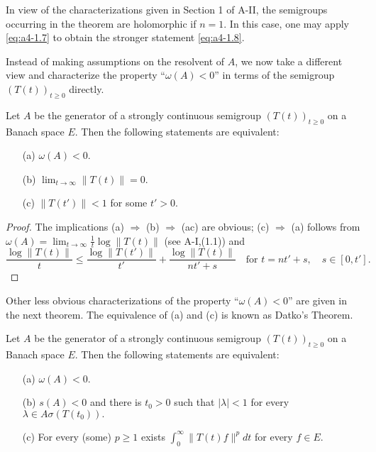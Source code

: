 \bigskip
\noindent In view of the characterizations given in Section 1 of A-II, the semigroups occurring in the theorem are holomorphic if \( n = 1 \). 
In this case, one may apply \eqref{eq:a4-1.7} to obtain the stronger statement \eqref{eq:a4-1.8}.

\bigskip\noindent Instead of making assumptions on the resolvent of \( A \), we now take a different view and characterize the property ``\( \omega(A) < 0 \)'' in terms of the semigroup \( (T(t))_{t \geq 0} \) directly.

\bigskip
\begin{proposition} \label{prop:a4-1.10} Let \( A \) be the generator of a strongly continuous semigroup \( (T(t))_{t \geq 0} \) on a Banach space $E$. 
Then the following statements are equivalent:
\begin{itemize}
\item[(a)] \( \omega(A) < 0 \).
\item[(b)] \( \lim_{t \to \infty} \| T(t) \| = 0 \).
\item[(c)] \( \| T(t') \| < 1 \) for some \( t' > 0 \).
\end{itemize}
\end{proposition}

\begin{proof}
The implications (a) \( \Rightarrow \) (b) \( \Rightarrow \) (ac) are obvious; (c) \( \Rightarrow \) (a) follows from  $\omega(A) = \lim_{t \to \infty} \frac{1}{t} \log \| T(t) \|$ (see A-I,(1.1)) and  
\[
\displaystyle
\frac{\log \|T(t)\|}{t} \leq \frac{\log \|T(t')\|}{t'} + \frac{\log \|T(t)\|}{nt' + s} \quad \text{for } t = nt' + s, \quad s \in [0,t'].
\]
\end{proof}

\noindent Other less obvious characterizations of the property ``\( \omega(A) < 0 \)'' are given in the next theorem. 
The equivalence of (a) and (c) is known as Datko’s Theorem.


\begin{theorem} \label{thm:a4-1.11} Let \( A \) be the generator of a strongly continuous semigroup \( (T(t))_{t \geq 0} \) on a Banach space \( E \). 
Then the following statements are equivalent:
\begin{itemize}
\item[(a)] \( \omega(A) < 0 \).
\item[(b)] \( s(A) < 0 \) and there is \( t_0 > 0 \) such that  
\(
|\lambda| < 1\) for every \( \lambda \in A\sigma (T(t_0)).\)
\item[(c)] For every (some) \( p \geq 1 \) exists \( \int_{0}^{\infty} \| T(t) f \|^p dt \) for every \( f \in E \).
\end{itemize}
\end{theorem}

